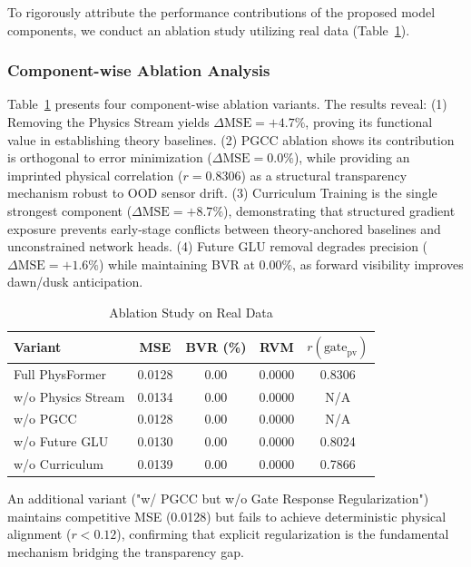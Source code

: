 To rigorously attribute the performance contributions of the proposed model components, we conduct an ablation study utilizing real data (Table~\ref{tab:ablation}).

\subsubsection{Component-wise Ablation Analysis}
Table~\ref{tab:ablation} presents four component-wise ablation variants. The results reveal: (1) Removing the Physics Stream yields $\Delta \text{MSE} = +4.7\%$, proving its functional value in establishing theory baselines. (2) PGCC ablation shows its contribution is orthogonal to error minimization ($\Delta\text{MSE}=0.0\%$), while providing an imprinted physical correlation ($r=0.8306$) as a structural transparency mechanism robust to OOD sensor drift. (3) Curriculum Training is the single strongest component ($\Delta \text{MSE} = +8.7\%$), demonstrating that structured gradient exposure prevents early-stage conflicts between theory-anchored baselines and unconstrained network heads. (4) Future GLU removal degrades precision ($\Delta \text{MSE} = +1.6\%$) while maintaining BVR at $0.00\%$, as forward visibility improves dawn/dusk anticipation.

\begin{table}[htbp]
\centering
\caption{Ablation Study on Real Data}
\label{tab:ablation}
\footnotesize
\setlength{\tabcolsep}{3pt}
\begin{tabular*}{\columnwidth}{@{\extracolsep{\fill}}lcccc@{}}
\toprule
Variant & MSE & BVR (\%) & RVM & $r(\text{gate}_{\text{pv}})$ \\
\midrule
Full PhysFormer & 0.0128 & 0.00 & 0.0000 & 0.8306 \\
w/o Physics Stream & 0.0134 & 0.00 & 0.0000 & N/A \\
w/o PGCC & 0.0128 & 0.00 & 0.0000 & N/A \\
w/o Future GLU & 0.0130 & 0.00 & 0.0000 & 0.8024 \\
w/o Curriculum & 0.0139 & 0.00 & 0.0000 & 0.7866 \\
\bottomrule
\end{tabular*}
\end{table}

An additional variant ("w/ PGCC but w/o Gate Response Regularization") maintains competitive MSE (0.0128) but fails to achieve deterministic physical alignment ($r < 0.12$), confirming that explicit regularization is the fundamental mechanism bridging the transparency gap.
